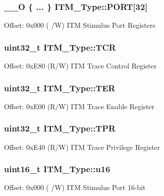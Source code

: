 \subsubsection[{\texorpdfstring{P\+O\+RT}{PORT}}]{\setlength{\rightskip}{0pt plus 5cm}\+\_\+\+\_\+O \{ ... \}    I\+T\+M\+\_\+\+Type\+::\+P\+O\+RT\mbox{[}32\mbox{]}}\hypertarget{struct_i_t_m___type_afe056e8c8f8c5519d9b47611fa3a4c46}{}\label{struct_i_t_m___type_afe056e8c8f8c5519d9b47611fa3a4c46}
Offset\+: 0x000 ( /W) I\+TM Stimulus Port Registers 
\subsubsection[{\texorpdfstring{T\+CR}{TCR}}]{ uint32\+\_\+t I\+T\+M\+\_\+\+Type\+::\+T\+CR}\hypertarget{struct_i_t_m___type_a58f169e1aa40a9b8afb6296677c3bb45}{}\label{struct_i_t_m___type_a58f169e1aa40a9b8afb6296677c3bb45}
Offset\+: 0x\+E80 (R/W) I\+TM Trace Control Register 
\subsubsection[{\texorpdfstring{T\+ER}{TER}}]{ uint32\+\_\+t I\+T\+M\+\_\+\+Type\+::\+T\+ER}\hypertarget{struct_i_t_m___type_a91a040e1b162e1128ac1e852b4a0e589}{}\label{struct_i_t_m___type_a91a040e1b162e1128ac1e852b4a0e589}
Offset\+: 0x\+E00 (R/W) I\+TM Trace Enable Register 
\subsubsection[{\texorpdfstring{T\+PR}{TPR}}]{ uint32\+\_\+t I\+T\+M\+\_\+\+Type\+::\+T\+PR}\hypertarget{struct_i_t_m___type_a93b480aac6da620bbb611212186d47fa}{}\label{struct_i_t_m___type_a93b480aac6da620bbb611212186d47fa}
Offset\+: 0x\+E40 (R/W) I\+TM Trace Privilege Register 
\subsubsection[{\texorpdfstring{u16}{u16}}]{ uint16\+\_\+t I\+T\+M\+\_\+\+Type\+::u16}\hypertarget{struct_i_t_m___type_a12aa4eb4d9dcb589a5d953c836f4e8f4}{}\label{struct_i_t_m___type_a12aa4eb4d9dcb589a5d953c836f4e8f4}
Offset\+: 0x000 ( /W) I\+TM Stimulus Port 16-\/bit 
